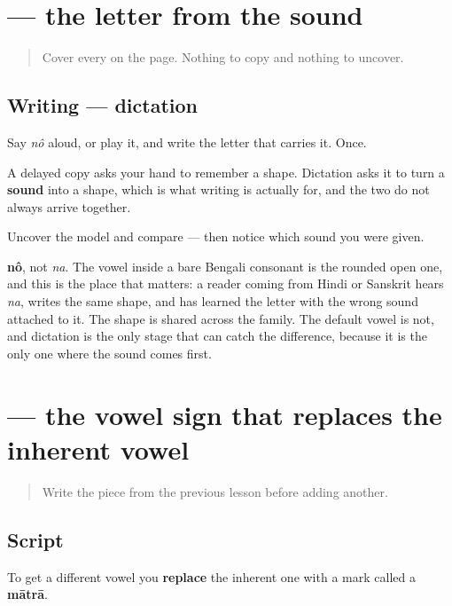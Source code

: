 \section[\texorpdfstring{\bn{ন} (nô)}{ন (nô)}]{ — the letter from the sound}

\label{lesson:BN-W01-na-dictation}



\begin{quote}
Cover every \textbf{} on the page. Nothing to copy and nothing to uncover.
\end{quote}

\subsection*{Writing — dictation}
Say \emph{nô} aloud, or play it, and write the letter that carries it. Once.

A delayed copy asks your hand to remember a shape. Dictation asks it to turn a \textbf{sound} into a shape, which is what writing is actually for, and the two do not always arrive together.

\begin{tcolorbox}[breakable,colback=teal!4,colframe=teal!35!black,title={Before you move on}]
Uncover the model and compare — then notice which sound you were given.

\textbf{nô}, not \emph{na}. The vowel inside a bare Bengali consonant is the rounded open one, and this is the place that matters: a reader coming from Hindi or Sanskrit hears \emph{na}, writes the same shape, and has learned the letter with the wrong sound attached to it. The shape is shared across the family. The default vowel is not, and dictation is the only stage that can catch the difference, because it is the only one where the sound comes first.
\end{tcolorbox}
\section[\texorpdfstring{\bn{া} (-a)}{া (-a)}]{ — the vowel sign that replaces the inherent vowel}

\label{lesson:BN-W01-aa-matra}



\begin{quote}
Write the piece from the previous lesson before adding another.
\end{quote}

\subsection*{Script}
To get a different vowel you \textbf{replace} the inherent one with a mark called a \textbf{mātrā}.

